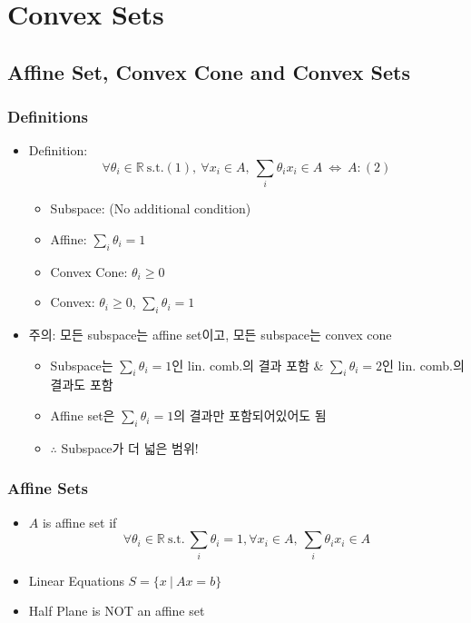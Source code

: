 \section{Convex Sets}

\subsection{Affine Set, Convex Cone and Convex Sets}

\subsubsection*{Definitions}
\begin{itemize}
    \item Definition:
    $$ \forall \theta_i \in \mathbb{R}~\mathrm{s.t. (1)},~
        \forall x_i \in A,~\sum_i \theta_i x_i \in A~\Leftrightarrow~A: \mathrm{(2)} $$
    \begin{itemize}
        \item Subspace: (No additional condition)
        \item Affine: $\sum_i \theta_i = 1$
        \item Convex Cone: $\theta_i \geq 0$
        \item Convex: $\theta_i \geq 0$, $\sum_i \theta_i = 1$
    \end{itemize}
    \item 주의: 모든 subspace는 affine set이고, 모든 subspace는 convex cone
    \begin{itemize}
        \item Subspace는 $\sum_i \theta_i = 1$인 lin. comb.의 결과 포함 \& $\sum_i \theta_i = 2$인 lin. comb.의 결과도 포함
        \item Affine set은 $\sum_i \theta_i = 1$의 결과만 포함되어있어도 됨
        \item $\therefore$ Subspace가 더 넓은 범위!
    \end{itemize}
\end{itemize}

\subsubsection*{Affine Sets}
\begin{itemize}
    \item $A$ is affine set if
        $$ \forall \theta_i \in \mathbb{R}~\mathrm{s.t.}~\sum_i \theta_i = 1,
            \forall x_i \in A,~\sum_i \theta_i x_i \in A $$
    \item Linear Equations $S = \{x~|~Ax=b\}$
    \item Half Plane is NOT an affine set
\end{itemize}

